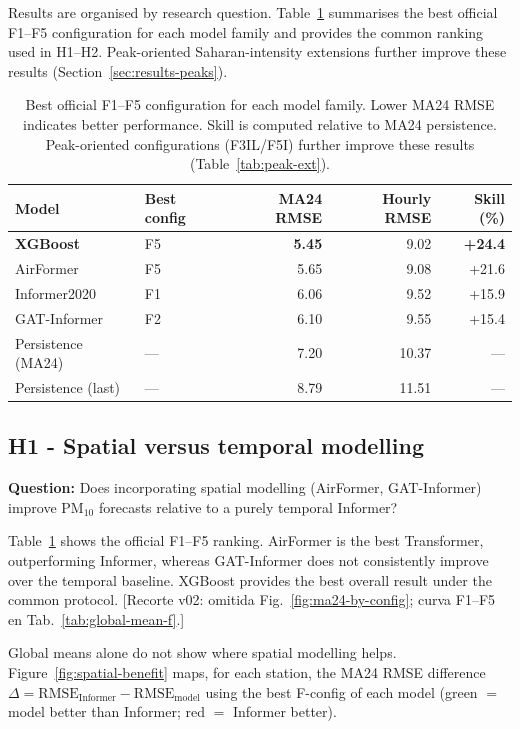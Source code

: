 \documentclass[11pt]{article}
\newcommand{\revnew}[1]{\textcolor{orange!75!black}{#1}}
\begin{document}
Results are organised by research question. Table~\ref{tab:results-best} summarises the best official F1--F5 configuration for each model family and provides the common ranking used in H1--H2. Peak-oriented Saharan-intensity extensions further improve these results (Section~\ref{sec:results-peaks}).

\begin{table}[ht]
\centering
\caption{Best official F1--F5 configuration for each model family. Lower MA24 RMSE indicates better performance. Skill is computed relative to MA24 persistence. Peak-oriented configurations (F3IL/F5I) further improve these results (Table~\ref{tab:peak-ext}).}
\label{tab:results-best}
\small
\begin{tabular}{@{}llrrr@{}}
\toprule
Model & Best config & MA24 RMSE & Hourly RMSE & Skill (\%) \\
\midrule
\textbf{XGBoost} & F5 & \textbf{5.45} & 9.02 & \textbf{+24.4} \\
AirFormer & F5 & 5.65 & 9.08 & +21.6 \\
Informer2020 & F1 & 6.06 & 9.52 & +15.9 \\
GAT-Informer & F2 & 6.10 & 9.55 & +15.4 \\
Persistence (MA24) & --- & 7.20 & 10.37 & --- \\
Persistence (last) & --- & 8.79 & 11.51 & --- \\
\bottomrule
\end{tabular}
\end{table}

\subsection{H1 - Spatial versus temporal modelling}
\label{sec:results-h1}
\label{sec:results-spatial-map}

\textbf{Question:} Does incorporating spatial modelling (AirFormer, GAT-Informer) improve PM$_{10}$ forecasts relative to a purely temporal Informer?

Table~\ref{tab:results-best} shows the official F1--F5 ranking. AirFormer is the best Transformer, outperforming Informer, whereas GAT-Informer does not consistently improve over the temporal baseline. XGBoost provides the best overall result under the common protocol. \revnew{[Recorte v02: omitida Fig.~\ref{fig:ma24-by-config}; curva F1--F5 en Tab.~\ref{tab:global-mean-f}.]}

Global means alone do not show where spatial modelling helps. Figure~\ref{fig:spatial-benefit} maps, for each station, the MA24 RMSE difference $\Delta = \mathrm{RMSE}_{\mathrm{Informer}} - \mathrm{RMSE}_{\mathrm{model}}$ using the best F-config of each model (green $=$ model better than Informer; red $=$ Informer better).
\end{document}
